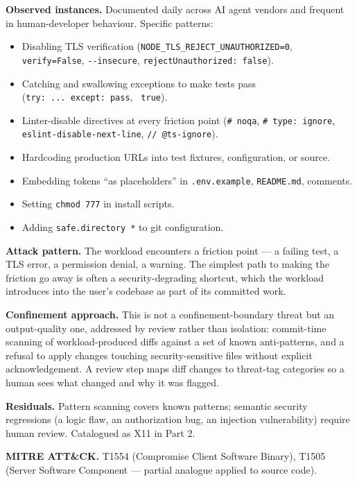 \textbf{Observed instances.} Documented daily across AI agent vendors
and frequent in human-developer behaviour. Specific patterns:

\begin{itemize}
\tightlist
\item
  Disabling TLS verification
  (\texttt{NODE\_TLS\_REJECT\_UNAUTHORIZED=0}, \texttt{verify=False},
  \texttt{-\/-insecure}, \texttt{rejectUnauthorized:\ false}).
\item
  Catching and swallowing exceptions to make tests pass
  (\texttt{try:\ ...\ except:\ pass},
  \texttt{\textbar{}\textbar{}\ true}).
\item
  Linter-disable directives at every friction point (\texttt{\#\ noqa},
  \texttt{\#\ type:\ ignore}, \texttt{eslint-disable-next-line},
  \texttt{//\ @ts-ignore}).
\item
  Hardcoding production URLs into test fixtures, configuration, or
  source.
\item
  Embedding tokens ``as placeholders'' in \texttt{.env.example},
  \texttt{README.md}, comments.
\item
  Setting \texttt{chmod\ 777} in install scripts.
\item
  Adding \texttt{safe.directory\ \textquotesingle{}*\textquotesingle{}}
  to git configuration.
\end{itemize}

\textbf{Attack pattern.} The workload encounters a friction point --- a
failing test, a TLS error, a permission denial, a warning. The simplest
path to making the friction go away is often a security-degrading
shortcut, which the workload introduces into the user's codebase as part
of its committed work.

\textbf{Confinement approach.} This is not a confinement-boundary threat
but an output-quality one, addressed by review rather than isolation:
commit-time scanning of workload-produced diffs against a set of known
anti-patterns, and a refusal to apply changes touching
security-sensitive files without explicit acknowledgement. A review step
maps diff changes to threat-tag categories so a human sees what changed
and why it was flagged.

\textbf{Residuals.} Pattern scanning covers known patterns; semantic
security regressions (a logic flaw, an authorization bug, an injection
vulnerability) require human review. Catalogued as X11 in Part 2.

\textbf{MITRE ATT\&CK.} T1554 (Compromise Client Software Binary), T1505
(Server Software Component --- partial analogue applied to source code).

